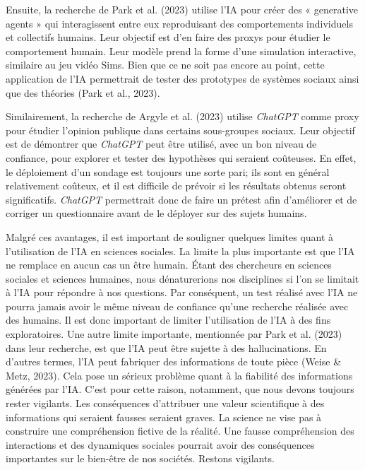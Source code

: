 \documentclass[
  letterpaper,
  DIV=11,
  numbers=noendperiod,
  oneside]{scrreprt}
\begin{document}
Ensuite, la recherche de Park et al. (2023) utilise l'IA pour créer des
« generative agents » qui interagissent entre eux reproduisant des
comportements individuels et collectifs humains. Leur objectif est d'en
faire des proxys pour étudier le comportement humain. Leur modèle prend
la forme d'une simulation interactive, similaire au jeu vidéo Sims. Bien
que ce ne soit pas encore au point, cette application de l'IA
permettrait de tester des prototypes de systèmes sociaux ainsi que des
théories (Park et al., 2023).

Similairement, la recherche de Argyle et al. (2023) utilise
\emph{ChatGPT} comme proxy pour étudier l'opinion publique dans certains
sous-groupes sociaux. Leur objectif est de démontrer que \emph{ChatGPT}
peut être utilisé, avec un bon niveau de confiance, pour explorer et
tester des hypothèses qui seraient coûteuses. En effet, le déploiement
d'un sondage est toujours une sorte pari; ils sont en général
relativement coûteux, et il est difficile de prévoir si les résultats
obtenus seront significatifs. \emph{ChatGPT} permettrait donc de faire
un prétest afin d'améliorer et de corriger un questionnaire avant de le
déployer sur des sujets humains.

Malgré ces avantages, il est important de souligner quelques limites
quant à l'utilisation de l'IA en sciences sociales. La limite la plus
importante est que l'IA ne remplace en aucun cas un être humain. Étant
des chercheurs en sciences sociales et sciences humaines, nous
dénaturerions nos disciplines si l'on se limitait à l'IA pour répondre à
nos questions. Par conséquent, un test réalisé avec l'IA ne pourra
jamais avoir le même niveau de confiance qu'une recherche réalisée avec
des humains. Il est donc important de limiter l'utilisation de l'IA à
des fins exploratoires. Une autre limite importante, mentionnée par Park
et al. (2023) dans leur recherche, est que l'IA peut être sujette à des
hallucinations. En d'autres termes, l'IA peut fabriquer des informations
de toute pièce (Weise \& Metz, 2023). Cela pose un sérieux problème
quant à la fiabilité des informations générées par l'IA. C'est pour
cette raison, notamment, que nous devons toujours rester vigilants. Les
conséquences d'attribuer une valeur scientifique à des informations qui
seraient fausses seraient graves. La science ne vise pas à construire
une compréhension fictive de la réalité. Une fausse compréhension des
interactions et des dynamiques sociales pourrait avoir des conséquences
importantes sur le bien-être de nos sociétés. Restons vigilants.
\end{document}
